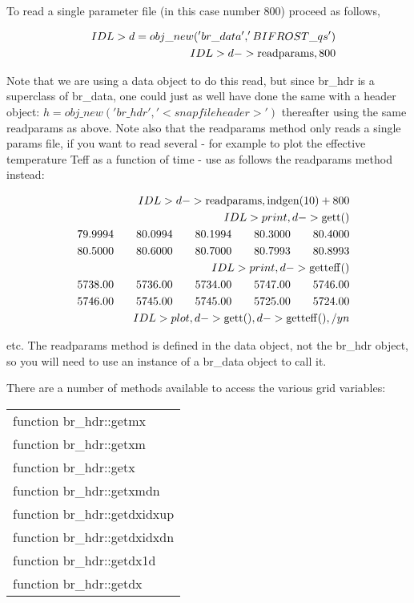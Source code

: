 \documentclass[12pt,preprint]{aastex}
\begin{document}
To read a single parameter file (in this case number 800) proceed as follows,

\begin{eqnarray}
&& IDL> d=obj\_new('br\_data','BIFROST\_qs') \\
&& IDL> d->{\rm readparams},800 
\end{eqnarray}

Note that we are using a data 
object to do this read, but since br\_hdr is a superclass of br\_data, one could just as well 
have done the same with a header object: $h=obj\_new('br\_hdr','<snapfileheader>')$ 
thereafter using the same readparams as above. Note also that the readparams method only 
reads a single params file, if you want to read several - for example to plot the effective 
temperature Teff as a function of time - use as follows the readparams method instead:

\begin{eqnarray}
&& IDL> d->{\rm readparams,indgen}(10)+800  \\
&& IDL> print,d->{\rm gett}() \\
&&     79.9994\ \ \ \ \ \ 80.0994\ \ \ \ \ \  80.1994\ \ \ \ \ \  80.3000\ \ \ \ \ \  80.4000 \\
&&      80.5000\ \ \ \ \ \  80.6000\ \ \ \ \ \  80.7000\ \ \ \ \ \ 80.7993 \ \ \ \ \ \  80.8993 \\
&& IDL> print,d->{\rm getteff}() \\
&&       5738.00\ \ \ \ \ \  5736.00\ \ \ \ \ \ 5734.00\ \ \ \ \ \  5747.00\ \ \ \ \ \  5746.00 \\
&&      5746.00\ \ \ \ \ \   5745.00\ \ \ \ \ \  5745.00\ \ \ \ \ \  5725.00\ \ \ \ \ \  5724.00 \\
&& IDL> plot,d->{\rm gett}(),d->{\rm getteff}(),/yn
\end{eqnarray}

\noindent etc. The readparams method is defined in the data object, not the br\_hdr object, 
so you will need to use an instance of a br\_data object to call it.

There are a number of methods available to access 
the various grid variables:

\begin{tabular}{l}
function br\_hdr::getmx \\
function br\_hdr::getxm \\
function br\_hdr::getx \\
function br\_hdr::getxmdn \\
function br\_hdr::getdxidxup \\
function br\_hdr::getdxidxdn \\
function br\_hdr::getdx1d \\
function br\_hdr::getdx 
\end{tabular}
\end{document}
